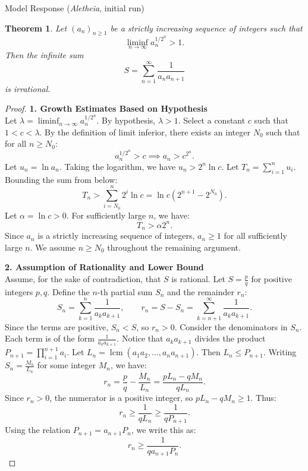 \documentclass[11pt]{article}
\newtheorem{theorem}{Theorem}
\begin{document}
\begin{solution}{Model Response (\emph{Aletheia}, initial run)}

\begin{theorem}
Let $(a_n)_{n \ge 1}$ be a strictly increasing sequence of integers such that
\[ \liminf_{n \to \infty} a_n^{1/2^n} > 1. \]
Then the infinite sum
\[ S = \sum_{n=1}^\infty \frac{1}{a_n a_{n+1}} \]
is irrational.
\end{theorem}

\begin{proof}
\textbf{1. Growth Estimates Based on Hypothesis} \\
Let $\lambda = \liminf_{n \to \infty} a_n^{1/2^n}$. By hypothesis, $\lambda > 1$. Select a constant $c$ such that $1 < c < \lambda$. By the definition of limit inferior, there exists an integer $N_0$ such that for all $n \ge N_0$:
\[ a_n^{1/2^n} > c \implies a_n > c^{2^n}. \]
Let $u_n = \ln a_n$. Taking the logarithm, we have $u_n > 2^n \ln c$.
Let $T_n = \sum_{i=1}^n u_i$. Bounding the sum from below:
\[ T_n > \sum_{i=N_0}^n 2^i \ln c = \ln c (2^{n+1} - 2^{N_0}). \]
Let $\alpha = \ln c > 0$. For sufficiently large $n$, we have:
\begin{equation}
T_n > \alpha 2^n.
\end{equation}
Since $a_n$ is a strictly increasing sequence of integers, $a_n \ge 1$ for all sufficiently large $n$. We assume $n \ge N_0$ throughout the remaining argument.

\vspace{1em}
\textbf{2. Assumption of Rationality and Lower Bound} \\
Assume, for the sake of contradiction, that $S$ is rational. Let $S = \frac{p}{q}$ for positive integers $p, q$.
Define the $n$-th partial sum $S_n$ and the remainder $r_n$:
\[ S_n = \sum_{k=1}^n \frac{1}{a_k a_{k+1}}, \qquad r_n = S - S_n = \sum_{k=n+1}^\infty \frac{1}{a_k a_{k+1}}. \]
Since the terms are positive, $S_n < S$, so $r_n > 0$.
Consider the denominators in $S_n$. Each term is of the form $\frac{1}{a_k a_{k+1}}$. Notice that $a_k a_{k+1}$ divides the product $P_{n+1} = \prod_{i=1}^{n+1} a_i$.
Let $L_n = \operatorname{lcm}(a_1 a_2, \dots, a_n a_{n+1})$. Then $L_n \le P_{n+1}$.
Writing $S_n = \frac{M_n}{L_n}$ for some integer $M_n$, we have:
\[ r_n = \frac{p}{q} - \frac{M_n}{L_n} = \frac{p L_n - q M_n}{q L_n}. \]
Since $r_n > 0$, the numerator is a positive integer, so $p L_n - q M_n \ge 1$.
Thus:
\begin{equation}
r_n \ge \frac{1}{q L_n} \ge \frac{1}{q P_{n+1}}.
\end{equation}
Using the relation $P_{n+1} = a_{n+1} P_n$, we write this as:
\[ r_n \ge \frac{1}{q a_{n+1} P_n}. \]


\end{proof}
\end{solution}
\end{document}

